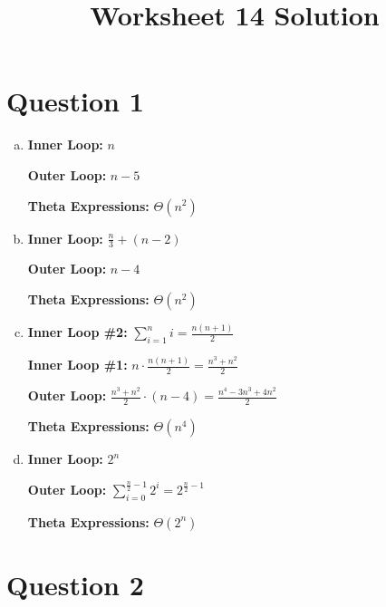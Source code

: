 \documentclass[12pt]{article}
\begin{document}
\title{Worksheet 14 Solution}
\maketitle

\section*{Question 1}
\begin{enumerate}[a.]
    \item

    \textbf{Inner Loop:} $n$

    \textbf{Outer Loop:} $n - 5$

    \textbf{Theta Expressions:} $\Theta (n^2)$

    \item

    \textbf{Inner Loop:} $\displaystyle \frac{n}{3} + (n - 2)$

    \textbf{Outer Loop:} $n - 4$

    \textbf{Theta Expressions:} $\Theta (n^2)$

    \item

    \textbf{Inner Loop \#2:} $\sum\limits_{i=1}^n i = \displaystyle\frac{n(n+1)}{2}$

    \textbf{Inner Loop \#1:} $n \cdot \displaystyle\frac{n(n+1)}{2} = \displaystyle\frac{n^3 + n^2}{2}$

    \textbf{Outer Loop:} $\displaystyle\frac{n^3 + n^2}{2} \cdot (n - 4) = \displaystyle\frac{n^4 - 3n^3 + 4n^2}{2}$

    \textbf{Theta Expressions:} $\Theta (n^4)$

    \item

    \textbf{Inner Loop:} $2^n$

    \textbf{Outer Loop:} $\displaystyle\sum\limits_{i=0}^{\frac{n}{2} - 1} 2^i = 2^{\frac{n}{2} - 1}$

    \textbf{Theta Expressions:} $\Theta (2^n)$


\end{enumerate}

\section*{Question 2}
\end{document}
